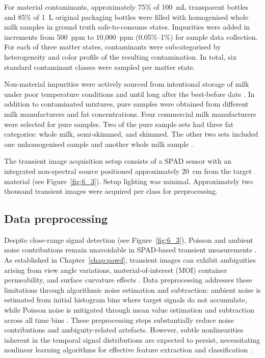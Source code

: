 \documentclass[12pt,a4paper,oneside]{report}
\begin{document}
For material contaminants, approximately 75\% of 100~mL transparent bottles and 85\% of 1~L original packaging bottles were filled with homogenised whole milk samples in ground truth safe-to-consume states. Impurities were added in increments from 500~ppm to 10,000~ppm (0.05\%--1\%) for sample data collection. For each of three matter states, contaminants were subcategorised by heterogeneity and color profile of the resulting contamination. In total, six standard contaminant classes were sampled per matter state.

Non-material impurities were actively sourced from intentional storage of milk under poor temperature conditions and until long after the best-before date \cite{lott2023,burgwald1947}. In addition to contaminated mixtures, pure samples were obtained from different milk manufacturers and fat concentrations. Four commercial milk manufacturers were selected for pure samples. Two of the pure sample sets had three fat categories: whole milk, semi-skimmed, and skimmed. The other two sets included one unhomogenised sample and another whole milk sample \cite{walstra1999,michalski2007}.

The transient image acquisition setup consists of a SPAD sensor with an integrated non-spectral source positioned approximately 20~cm from the target material (see Figure~\ref{fig:6_3}). Setup lighting was minimal. Approximately two thousand transient images were acquired per class for preprocessing.

\subsection{Data preprocessing}
\label{subsec:data_preprocessing_chapter6}

Despite close-range signal detection (see Figure~\ref{fig:6_3}), Poisson and ambient noise contributions remain unavoidable in SPAD-based transient measurements \cite{piron2020}. As established in Chapter~\ref{chap:pawd}, transient images can exhibit ambiguities arising from view angle variations, material-of-interest (MOI) container permeability, and surface curvature effects \cite{jungerman2022,tontini2024}. Data preprocessing addresses these limitations through algorithmic noise estimation and subtraction: ambient noise is estimated from initial histogram bins where target signals do not accumulate, while Poisson noise is mitigated through mean value estimation and subtraction across all time bins \cite{tontini2020}. These preprocessing steps substantially reduce noise contributions and ambiguity-related artefacts. However, subtle nonlinearities inherent in the temporal signal distributions are expected to persist, necessitating nonlinear learning algorithms for effective feature extraction and classification \cite{lecun1998,su2016}.
\end{document}
